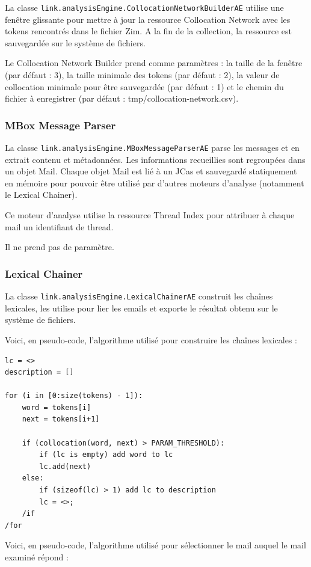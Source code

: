 \documentclass[a4paper]{article}
\begin{document}
La classe \texttt{link.analysisEngine.CollocationNetworkBuilderAE} utilise une fenêtre glissante pour mettre à jour la ressource Collocation Network avec les tokens rencontrés dans le fichier Zim. A la fin de la collection, la ressource est sauvegardée sur le système de fichiers.

Le Collocation Network Builder prend comme paramètres : la taille de la fenêtre (par défaut : 3), la taille minimale des tokens (par défaut : 2), la valeur de collocation minimale pour être sauvegardée (par défaut : 1) et le chemin du fichier à enregistrer (par défaut : tmp/collocation-network.csv).

\subsubsection{MBox Message Parser}

La classe \texttt{link.analysisEngine.MBoxMessageParserAE} parse les messages et en extrait contenu et métadonnées. Les informations recueillies sont regroupées dans un objet Mail. Chaque objet Mail est lié à un JCas et sauvegardé statiquement en mémoire pour pouvoir être utilisé par d'autres moteurs d'analyse (notamment le Lexical Chainer).

Ce moteur d'analyse utilise la ressource Thread Index pour attribuer à chaque mail un identifiant de thread.

Il ne prend pas de paramètre.

\subsubsection{Lexical Chainer}

La classe \texttt{link.analysisEngine.LexicalChainerAE} construit les chaînes lexicales, les utilise pour lier les emails et exporte le résultat obtenu sur le système de fichiers.

Voici, en pseudo-code, l'algorithme utilisé pour construire les chaînes lexicales :
	
\begin{lstlisting}
lc = <>
description = []

for (i in [0:size(tokens) - 1]):
	word = tokens[i]
	next = tokens[i+1]
	
	if (collocation(word, next) > PARAM_THRESHOLD):
		if (lc is empty) add word to lc
		lc.add(next)
	else:
		if (sizeof(lc) > 1) add lc to description
		lc = <>;
	/if
/for
\end{lstlisting}

Voici, en pseudo-code, l'algorithme utilisé pour sélectionner le mail auquel le mail examiné répond :
\end{document}
